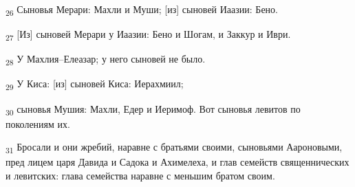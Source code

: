 \begin{tcolorbox}
\textsubscript{26} Сыновья Мерари: Махли и Муши; [из] сыновей Иаазии: Бено.
\end{tcolorbox}
\begin{tcolorbox}
\textsubscript{27} [Из] сыновей Мерари у Иаазии: Бено и Шогам, и Заккур и Иври.
\end{tcolorbox}
\begin{tcolorbox}
\textsubscript{28} У Махлия--Елеазар; у него сыновей не было.
\end{tcolorbox}
\begin{tcolorbox}
\textsubscript{29} У Киса: [из] сыновей Киса: Иерахмиил;
\end{tcolorbox}
\begin{tcolorbox}
\textsubscript{30} сыновья Мушия: Махли, Едер и Иеримоф. Вот сыновья левитов по поколениям их.
\end{tcolorbox}
\begin{tcolorbox}
\textsubscript{31} Бросали и они жребий, наравне с братьями своими, сыновьями Аароновыми, пред лицем царя Давида и Садока и Ахимелеха, и глав семейств священнических и левитских: глава семейства наравне с меньшим братом своим.
\end{tcolorbox}

